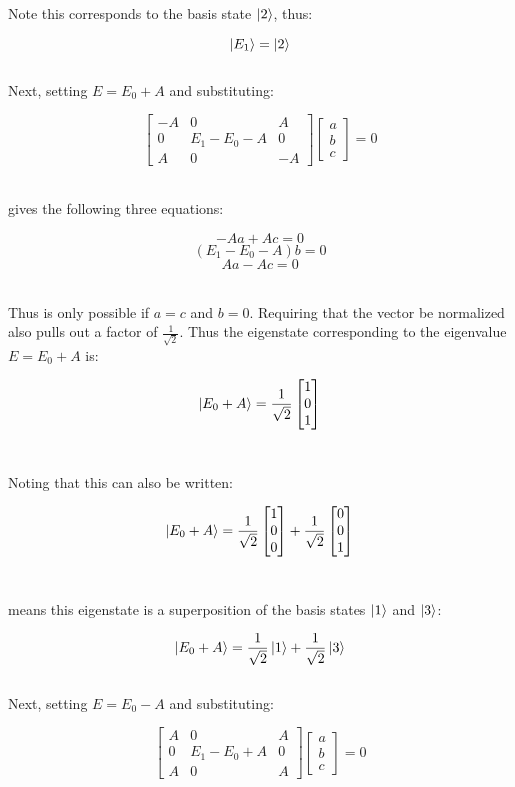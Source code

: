 \documentclass[14pt]{extarticle}
\begin{document}
Note this corresponds to the basis state $\ket 2$, thus:

$$\ket{E_1} = \ket 2$$ \\ 

Next, setting $E = E_0 +A$ and substituting:

$$
\begin{bmatrix}
        -A & 0 & A \\ 
        0 & E_1 - E_0 - A & 0 \\ 
        A & 0 & - A
\end{bmatrix}
\begin{bmatrix}
        a \\ b \\ c
\end{bmatrix}
=0
$$ \

gives the following three equations:

$$-Aa + Ac = 0$$
$$(E_1-E_0-A)b = 0$$
$$Aa - Ac = 0$$ \ 

Thus is only possible if $a = c$ and $b=0$. Requiring that the vector be normalized also pulls out a factor of $\frac{1}{\sqrt 2}$. Thus the eigenstate corresponding to the eigenvalue $E = E_0 +A$ is:

$$
\ket{E_0+A} = \frac{1}{\sqrt 2}
\begin{bmatrix} 1 \\ 0 \\ 1 \end{bmatrix}
$$ \ 

Noting that this can also be written:

$$
\ket{E_0+A} = \frac{1}{\sqrt 2}
\begin{bmatrix} 1 \\ 0 \\ 0 \end{bmatrix} +
\frac{1}{\sqrt 2}
\begin{bmatrix} 0 \\ 0 \\ 1 \end{bmatrix}
$$ \ 

means this eigenstate is a superposition of the basis states $\ket 1$ and $\ket 3$:

$$\ket{E_0+A} = \frac{1}{\sqrt 2} \ket 1 + \frac{1}{\sqrt 2} \ket 3$$ \\ 

Next, setting $E = E_0 - A$ and substituting:

$$
\begin{bmatrix}
        A & 0 & A \\       
        0 & E_1 - E_0 + A & 0 \\
        A & 0 & A
\end{bmatrix}
\begin{bmatrix}
        a \\ b \\ c
\end{bmatrix}
=0
$$ \
\end{document}
